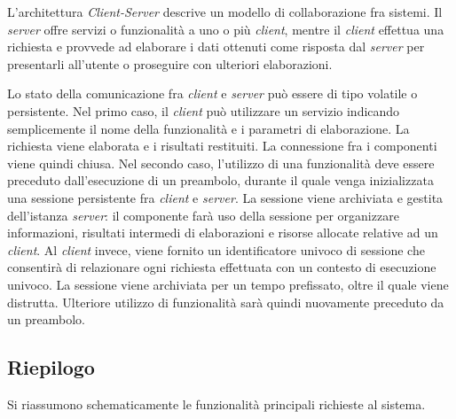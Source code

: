 L'architettura \emph{Client-Server} descrive un modello di collaborazione fra sistemi. Il \emph{server} offre servizi o funzionalità a uno o più \emph{client}, mentre il \emph{client} effettua una richiesta e provvede ad elaborare i dati ottenuti come risposta dal \emph{server} per presentarli all'utente o proseguire con ulteriori elaborazioni.

Lo stato della comunicazione fra \emph{client} e \emph{server} può essere di tipo volatile o persistente. Nel primo caso, il \emph{client} può utilizzare un servizio indicando semplicemente il nome della funzionalità e i parametri di elaborazione. La richiesta viene elaborata e i risultati restituiti. La connessione fra i componenti viene quindi chiusa. Nel secondo caso, l'utilizzo di una funzionalità deve essere preceduto dall'esecuzione di un preambolo, durante il quale venga inizializzata una sessione persistente fra \emph{client} e \emph{server}.
La sessione viene archiviata e gestita dell'istanza \emph{server}: il componente farà uso della sessione per organizzare informazioni, risultati intermedi di elaborazioni   e risorse allocate relative ad un \emph{client}. Al \emph{client} invece, viene fornito un identificatore univoco di sessione che consentirà di relazionare ogni richiesta effettuata con un contesto di esecuzione univoco. La sessione viene archiviata per un tempo prefissato, oltre il quale viene distrutta. Ulteriore utilizzo di funzionalità sarà quindi nuovamente preceduto da un preambolo.


\subsection{Riepilogo}

Si riassumono schematicamente le funzionalità principali richieste al sistema.

